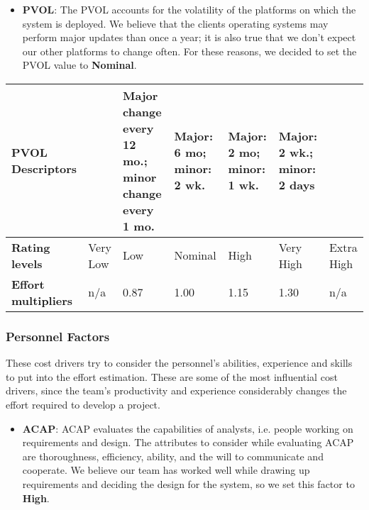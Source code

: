 		
		
		
		\begin{itemize}
			\item \textbf{PVOL}: The PVOL accounts for the volatility of the platforms on which the system is deployed. We believe that the clients operating systems may perform major updates than once a year; it is also true that we don't expect our other platforms to change often. For these reasons, we decided to set the PVOL value to \textbf{Nominal}.
		\end{itemize}
		
		\begin{center}
			\begin{tabular}{ | C{2cm} | C{2cm} | C{2cm} | C{2cm} | C{2cm} | C{2cm} | C{2cm} | }
				\hline
				\textbf{PVOL Descriptors} & & Major change every 12 mo.; minor change every 1 mo. & Major: 6 mo; minor: 2 wk. & Major: 2 mo; minor: 1 wk. & Major: 2 wk.; minor: 2 days & \\ \hline
			
				\textbf{Rating levels} & Very Low & Low & Nominal & High & Very High & Extra High\\ \hline
			
				\textbf{Effort multipliers} & n/a & 0.87 & 1.00 & 1.15 & 1.30 & n/a\\ \hline
			\end{tabular}
		\end{center}
		
		
	
	\subsubsection*{Personnel Factors}
	These cost drivers try to consider the personnel's abilities, experience and skills to put into the effort estimation. These are some of the most influential cost drivers, since the team's productivity and experience considerably changes the effort required to develop a project. 
	
	
		\begin{itemize}
			\item \textbf{ACAP}: ACAP evaluates the capabilities of analysts, i.e. people working on requirements and design. The attributes to consider while evaluating ACAP are thoroughness, efficiency, ability, and the will to communicate and cooperate. We believe our team has worked well while drawing up requirements and deciding the design for the system, so we set this factor to \textbf{High}.
		\end{itemize}
		
